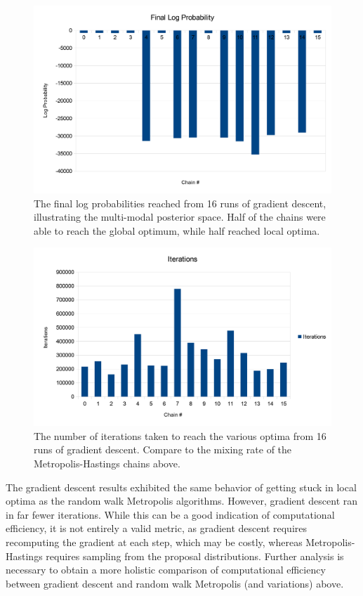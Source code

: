 \documentclass[runningheads]{llncs}
\begin{document}
\begin{figure}[t]
\begin{center}
   \includegraphics[width=0.8\linewidth]{figs/grad-desc-log-prob.png}
\end{center}
   \caption{The final log probabilities reached from 16 runs of gradient descent, illustrating the multi-modal posterior 
        space. Half of the chains were able to reach the global optimum, while 
        half reached local optima.}
\label{fig:grad-desc-log-prob}
\end{figure}

\begin{figure}[t]
\begin{center}
   \includegraphics[width=0.8\linewidth]{figs/grad-desc-iterations.png}
\end{center}
   \caption{The number of iterations taken to reach the various optima from 16 
        runs of gradient descent. Compare to the mixing rate of the Metropolis-Hastings chains above.}
\label{fig:grad-desc-iterations}
\end{figure}

The gradient descent results exhibited the same behavior of getting stuck in 
local optima as the random walk Metropolis algorithms. However, gradient descent 
ran in far fewer iterations. While this can be a good indication of 
computational efficiency, it is not entirely a valid metric, as gradient 
descent requires recomputing the gradient at each step, which may be costly, 
whereas Metropolis-Hastings requires sampling from the proposal distributions. 
Further analysis is necessary to obtain a more holistic comparison of 
computational efficiency between 
gradient descent and random walk Metropolis (and variations) above.
\end{document}
